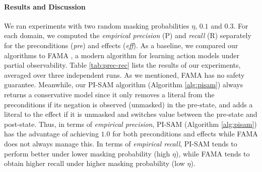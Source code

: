 \documentclass[letterpaper]{article} %
\newcommand{\pre}{\textit{pre}}
\newcommand{\eff}{\textit{eff}}
\begin{document}
\paragraph{Results and Discussion}
We ran experiments with two random masking probabilities $\eta$, $0.1$ and $0.3$.
For each domain, we computed the \textit{empirical precision} (P) and \textit{recall} (R) separately for the preconditions (\pre) and effects (\eff). As a baseline, we compared our algorithms to FAMA \cite{aineto2019learning}, a modern algorithm for learning action models under partial observability. Table \ref{tab:prec-rec} lists the results of our experiments, averaged over three independent runs.
As we mentioned, FAMA has no safety guarantee. Meanwhile, our PI-SAM algorithm (Algorithm \ref{alg:pisam}) always returns a conservative model since it only removes a literal from the preconditions if its negation is observed (unmasked) in the pre-state, and adds a literal to the effect if it is unmasked and switches value between the pre-state and post-state. Thus, in terms of \textit{empirical precision}, PI-SAM (Algorithm \ref{alg:pisam}) has the advantage of achieving $1.0$ for both preconditions and effects while FAMA does not always manage this. In terms of \textit{empirical recall}, PI-SAM tends to perform better under lower masking probability (high $\eta$), while FAMA tends to obtain higher recall under higher masking probability (low $\eta$). 

\end{document}
